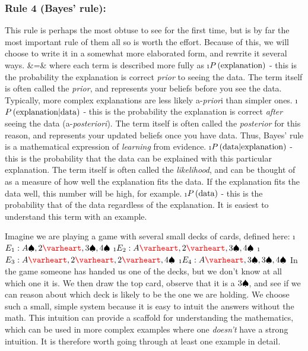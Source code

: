 \subsubsection{Rule 4 (Bayes' rule):}\label{sec:rule4} This rule is perhaps the most obtuse to see for the first time, but is by far the most important rule of them all so is worth the effort.  Because of this, we will choose to write it in a somewhat more elaborated form, and rewrite it several ways.
\beqn
{} &=& 
\eeqn
where each term is described more fully as 
\bi
\i $\P{explanation}$ - this is the probability the explanation is correct {\em prior} to seeing the data.  The term itself is often called the {\em prior}, and represents your beliefs before you see the data.  Typically, more complex explanations are less likely a-{\em prior}i than simpler ones.  
\i $\Pg{explanation}{data}$ - this is the probability the explanation is correct {\em after} seeing the data (a-{\em posteriori}). The term itself is often called the {\em posterior} for this reason, and represents your updated beliefs once you have data.  Thus, Bayes' rule is a mathematical expression of {\em learning} from evidence.  
\i $\Pg{data}{explanation}$ - this is the probability that the data can be explained with this particular explanation.  The term itself is often called the {\em likelihood}, and can be thought of as a measure of how well the explanation fits the data.  If the explanation fits the data well, this number will be high, for example. 
\i $\P{data}$ - this is the probability that of the data regardless of the explanation.  It is easiest to understand this term with an example.
\ei

Imagine we are playing a game with several small decks of cards, defined here:
\be
\i $E_1: A\spades, 2\hearts, 3\spades,4\spades$
\i $E_2: A\hearts, 2\hearts, 3\spades, 4\spades$
\i $E_3: A\hearts,2\hearts, 2\hearts,4\spades$
\i $E_4: A\hearts,3\spades, 3\spades, 4\spades$
\ee
In the game someone has handed us one of the decks, but we don't know at all which one it is.  We then draw the top card, observe that it is a $3\spades$, and see if we can reason about which deck is likely to be the one we are holding.  We choose such a small, simple system because it is easy to intuit the answers without the math.  This intuition can provide a scaffold for understanding the mathematics, which can be used in more complex examples where one {\em doesn't} have a strong intuition.  It is therefore worth going through at least one example in detail.


